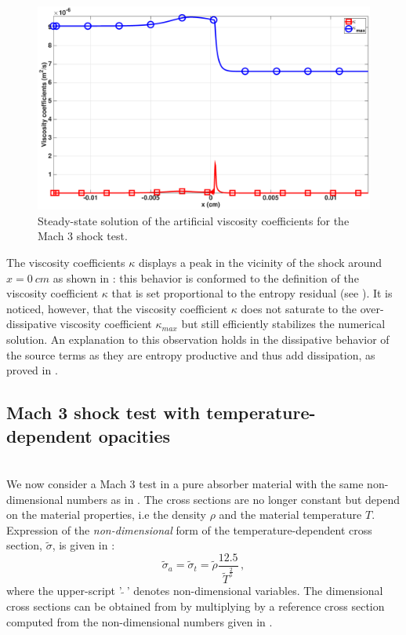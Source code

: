 \documentclass[times]{fldauth}
\begin{document}
%
\begin{figure}[H]
    \centering
    \includegraphics[width=\textwidth]{figures/cst-xs/mach_3_cst_xs_nel_1000_viscosity.eps}
    \caption{Steady-state solution of the artificial viscosity coefficients for the Mach 3 shock test.}\label{fig:mach-3-cst-xs-visc}
\end{figure}
%
The viscosity coefficients $\kappa$ displays a peak in the vicinity of the shock around $x=0 \ cm$ as shown in : this behavior is conformed to the definition of the viscosity coefficient $\kappa$ that is set proportional to the entropy residual (see ). It is noticed, however, that the viscosity coefficient $\kappa$ does not saturate to the over-dissipative viscosity coefficient $\kappa_{max}$ but still efficiently stabilizes the numerical solution. An explanation to this observation holds
in the dissipative behavior of the source terms as they are entropy productive and thus add dissipation, as proved in .
%
\subsection{Mach 3 shock test with temperature-dependent opacities}\label{sec:mach-3-no-cst-xs}
%
 \\
We now consider a Mach 3 test in a pure absorber material with the same non-dimensional numbers as in . The cross sections are no longer constant but depend on the material properties, i.e the density $\rho$ and the material temperature $T$. Expression of the \emph{non-dimensional} form of the temperature-dependent cross section, $\tilde{\sigma}$, is given in :
%
\begin{equation}\label{eq:opacity}
\tilde{\sigma}_a = \tilde{\sigma}_t = \tilde{\rho} \frac{12.5}{\tilde{T}^{\frac{2}{5}}}\, ,
\end{equation}
%
where the upper-script '$\ \tilde{} \ $' denotes non-dimensional variables. The dimensional cross sections can be obtained from  by multiplying by a reference cross section computed from the non-dimensional numbers given in .
\end{document}
